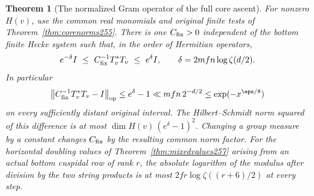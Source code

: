 \documentclass[a4paper,11pt]{article}
\newtheorem{theorem}[proposition]{Theorem}
\theoremstyle{definition}
\theoremstyle{remark}
\numberwithin{equation}{section}
\begin{document}
\begin{theorem}[The normalized Gram operator of the full core ascent]\leavevmode
\label{thm:coregram258}
For nonzero \(H(v)\), use the common real monomials and
original finite tests of Theorem~\ref{thm:corenorms255}. There
is one \(C_{\rm fix}>0\) independent of the bottom finite
Hecke system such that, in the order of Hermitian operators,
\[
  e^{-\delta}I\ \le\
  C_{\rm fix}^{-1}T_v^*T_v
   \ \le\ e^\delta I,\qquad
  \delta=2mfn\log\zeta(d/2).
\]
In particular
\[
 \big\|C_{\rm fix}^{-1}T_v^*T_v-I\big\|_{\rm op}
 \le e^\delta-1 \ll mfn\,2^{-d/2}
 \le \exp(-x^{\eps/8})
\]
on every sufficiently distant original interval. The
Hilbert--Schmidt norm squared of this difference is at most
\(\dim H(v)\,(e^\delta-1)^2\). Changing a group measure by a
constant changes \(C_{\rm fix}\) by the resulting common norm
factor. For the horizontal doubling values of
Theorem~\ref{thm:mixedvalues257} arising from an actual bottom
cuspidal row of rank \(r\), the absolute logarithm of the
modulus after division by the two string products is at most
\(2fr\log\zeta((r+6)/2)\) at every step.
\end{theorem}
\end{document}

